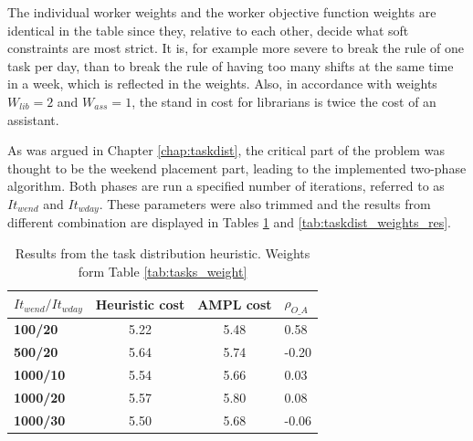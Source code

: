 The individual worker weights and the worker objective function weights are identical in the table since they, relative to each other, decide what soft constraints are most strict. It is, for example more severe to break the rule of one task per day, than to break the rule of having too many shifts at the same time in a week, which is reflected in the weights. Also, in accordance with weights $W_{lib} = 2$ and $W_{ass} = 1$, the stand in cost for librarians is twice the cost of an assistant.

As was argued in Chapter \ref{chap:taskdist}, the critical part of the problem was thought to be the weekend placement part, leading to the implemented two-phase algorithm. Both phases are run a specified number of iterations, referred to as $It_{wend}$ and $It_{wday}$. These parameters were also trimmed and the results from different combination are displayed in Tables \ref{tab:taskdist_res} and \ref{tab:taskdist_weights_res}. 

\begin{table}[!h]
\centering
\label{tab:taskdist_res}
\caption{Results from the task distribution heuristic. Weights form Table \ref{tab:tasks_weight}}
\begin{tabular}{|l|l|l|l|}
\hline
\rowcolor{Gray} \textbf{$It_{wend}/It_{wday}$} &  \textbf{Heuristic cost} &  \textbf{AMPL cost} & \textbf{$\rho_{O\_A}$} \\ \hline
\cellcolor{Gray} \textbf{100/20} & \multicolumn{1}{c|}{5.22} & \multicolumn{1}{c|}{5.48} & 0.58 \\
\cellcolor{Gray} \textbf{500/20} & \multicolumn{1}{c|}{5.64} & \multicolumn{1}{c|}{5.74} & -0.20 \\
\cellcolor{Gray} \textbf{1000/10} & \multicolumn{1}{c|}{5.54} & \multicolumn{1}{c|}{5.66} & 0.03 \\
\cellcolor{Gray} \textbf{1000/20} & \multicolumn{1}{c|}{5.57} & \multicolumn{1}{c|}{5.80} & 0.08 \\
\cellcolor{Gray} \textbf{1000/30} & \multicolumn{1}{c|}{5.50} & \multicolumn{1}{c|}{5.68} & -0.06 \\
\hline
\end{tabular}
\end{table}

